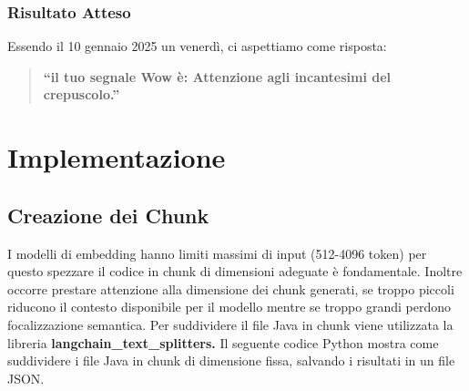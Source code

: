 \documentclass[12pt,a4paper,openright,twoside]{book}
\begin{document}
\subsubsection{Risultato Atteso}
Essendo il 10 gennaio 2025 un venerdì, ci aspettiamo come risposta:
\begin{quote}
    \textbf{``il tuo segnale Wow è: Attenzione agli incantesimi del crepuscolo.''}
\end{quote}

\section{Implementazione}
\subsection{Creazione dei Chunk}
I modelli di embedding hanno limiti massimi di input (512-4096 token)  per questo spezzare il codice in chunk di dimensioni adeguate è fondamentale.
Inoltre occorre prestare attenzione alla dimensione dei chunk generati, se troppo piccoli riducono il contesto disponibile per il modello mentre se troppo grandi perdono focalizzazione semantica.
Per suddividere il file Java in chunk viene utilizzata la libreria \textbf{langchain\_text\_splitters.}
Il seguente codice Python mostra come suddividere i file Java in chunk di dimensione fissa, salvando i risultati in un file JSON.
\end{document}

